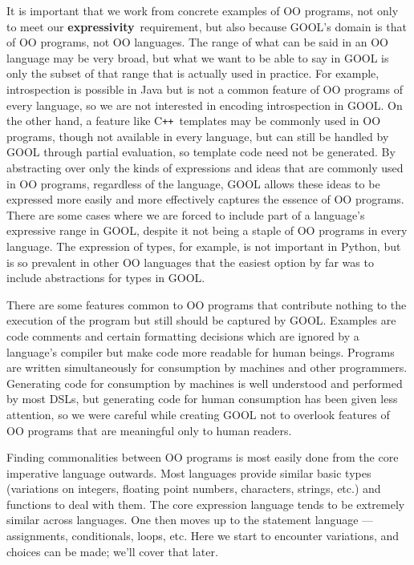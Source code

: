 \documentclass[sigplan,review,anonymous,prologue,dvipsnames]{acmart}
\newcommand{\Cplusplus}{C\texttt{++}}
\newcommand{\abbrev}[1]{\textbf{#1}}
\newcommand{\expressivity}{\abbrev{expressivity}}
\begin{document}
It is important that we work from concrete examples of OO programs, not only to 
meet our \expressivity~requirement, but also because GOOL's domain is that of 
OO programs, not OO languages. The range of what can be said in an OO language 
may be very broad, but what we want to be able to say in GOOL is only the 
subset of that range that is actually used in practice. For example, 
introspection is possible in Java but is not a common feature of OO programs of 
every language, so we are not interested in encoding introspection in GOOL. On 
the other hand, a feature like \Cplusplus~templates may be commonly used in OO 
programs, though not available in every language, but can still be handled by 
GOOL through partial evaluation, so template code need not be generated. By 
abstracting over only the kinds of expressions and ideas that are commonly used 
in OO programs, regardless of the language, GOOL allows these ideas to be 
expressed more easily and more effectively captures the essence of OO programs. 
There are some cases where we are forced to include part of a language's 
expressive range in GOOL, despite it not being a staple of OO programs in every 
language. The expression of types, for example, is not important in Python, but 
is so prevalent in other OO languages that the easiest option by far was to 
include abstractions for types in GOOL. 

There are some features common to OO programs that contribute nothing to the 
execution of the program but still should be captured by GOOL. Examples are 
code comments and certain formatting decisions which are ignored by a 
language's compiler but make code more readable for human beings. Programs are 
written simultaneously for consumption by machines and other programmers. 
Generating code for consumption by machines is well understood and performed by 
most DSLs, but generating code for human consumption has been given less 
attention, so we were careful while creating GOOL not to overlook features of 
OO programs that are meaningful only to human readers.

Finding commonalities between OO programs is most easily done from the core 
imperative language outwards.
Most languages provide similar basic types (variations on integers,
floating point numbers, characters, strings, etc.) and functions to deal
with them. The core expression language tends to be extremely similar
across languages. One then moves up to the statement language ---
assignments, conditionals, loops, etc.  Here we start to encounter
variations, and choices can be made; we'll cover that later.
\end{document}
